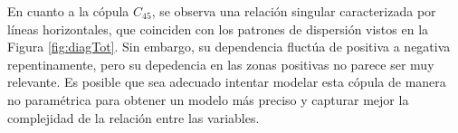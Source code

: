 En cuanto a la cópula $C_{45}$, se observa una relación singular caracterizada por líneas horizontales, que coinciden con los patrones de dispersión vistos en la Figura \ref{fig:diagTot}. Sin embargo, su dependencia fluctúa de positiva a negativa repentinamente, pero su depedencia en las zonas positivas no parece ser muy relevante. Es posible que sea adecuado intentar modelar esta cópula de manera no paramétrica para obtener un modelo más preciso y capturar mejor la complejidad de la relación entre las variables.


\begin{figure}[H]
 \centering
\end{figure}

